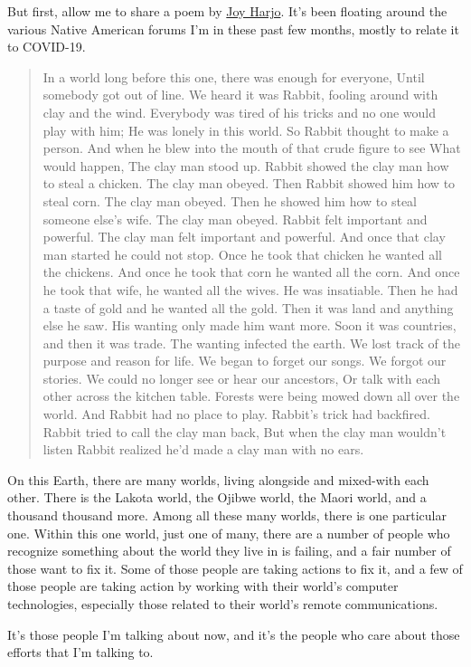 \documentclass[11pt]{article}
\begin{document}
\begin{itemize}
But first, allow me to share a poem by \href{https://www.joyharjo.com/}{Joy Harjo}. It’s been floating around the various Native American forums I’m in these past few months, mostly to relate it to COVID-19.
\begin{quote}
In a world long before this one, there was enough for everyone,
Until somebody got out of line.
We heard it was Rabbit, fooling around with clay and the wind.
Everybody was tired of his tricks and no one would play with him;
He was lonely in this world.
So Rabbit thought to make a person.
And when he blew into the mouth of that crude figure to see
What would happen,
The clay man stood up.
Rabbit showed the clay man how to steal a chicken.
The clay man obeyed.
Then Rabbit showed him how to steal corn.
The clay man obeyed.
Then he showed him how to steal someone else’s wife.
The clay man obeyed.
Rabbit felt important and powerful.
The clay man felt important and powerful.
And once that clay man started he could not stop.
Once he took that chicken he wanted all the chickens.
And once he took that corn he wanted all the corn.
And once he took that wife, he wanted all the wives.
He was insatiable.
Then he had a taste of gold and he wanted all the gold.
Then it was land and anything else he saw.
His wanting only made him want more.
Soon it was countries, and then it was trade.
The wanting infected the earth.
We lost track of the purpose and reason for life.
We began to forget our songs.
We forgot our stories.
We could no longer see or hear our ancestors,
Or talk with each other across the kitchen table.
Forests were being mowed down all over the world.
And Rabbit had no place to play.
Rabbit’s trick had backfired.
Rabbit tried to call the clay man back,
But when the clay man wouldn’t listen
Rabbit realized he’d made a clay man with no ears.
\end{quote}

On this Earth, there are many worlds, living alongside and mixed-with each other. There is the Lakota world, the Ojibwe world, the Maori world, and a thousand thousand more. Among all these many worlds, there is one particular one. Within this one world, just one of many, there are a number of people who recognize something about the world they live in is failing, and a fair number of those want to fix it. Some of those people are taking actions to fix it, and a few of those people are taking action by working with their world’s computer technologies, especially those related to their world’s remote communications.

It’s those people I’m talking about now, and it’s the people who care about those efforts that I’m talking to.


\end{itemize}
\end{document}

